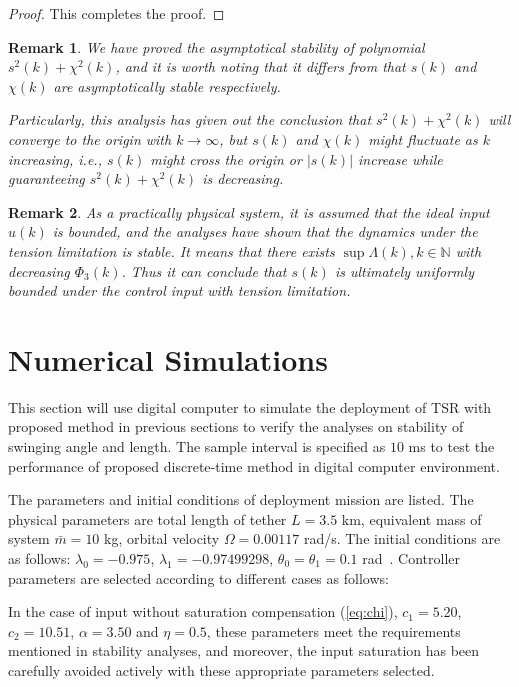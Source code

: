\documentclass[10pt,onecolumn,draftcls]{IEEEtran}
\newtheorem{myrem}{Remark}
\begin{document}
\begin{proof}
This completes the proof.\end{proof}
\begin{myrem}
	We have proved the asymptotical stability of polynomial $s^2(k)+\chi^2(k)$, and it is worth noting that it differs from that $s(k)$ and $\chi(k)$ are asymptotically stable respectively. 
	
	Particularly, this analysis has given out the conclusion that $s^2(k)+\chi^2(k)$ will converge to the origin with $k\to\infty$, but $s(k)$ and $\chi(k)$ might fluctuate as $k$ increasing, i.e., $s(k)$ might cross the origin or $\vert s(k)\vert$ increase while guaranteeing $s^2(k)+\chi^2(k)$ is decreasing. 
\end{myrem}
\begin{myrem}
	As a practically physical system, it is assumed that the ideal input $u(k)$ is bounded, and the analyses have shown that the dynamics under the tension limitation is stable. It means that there exists $\sup{\Lambda(k)},{k\in \mathbb{N}}$ with decreasing $\Phi_3(k)$. Thus it can conclude that $s(k)$ is ultimately uniformly bounded under the control input with tension limitation.
\end{myrem}

\section{Numerical Simulations}\label{sec:Numerical Simulations} 
This section will use digital computer to simulate the deployment of TSR with proposed method in previous sections to verify the analyses on stability of swinging angle and length. The sample interval is specified as $10$ ms to test the performance of proposed discrete-time method in digital computer environment. 

The parameters and initial conditions of deployment mission are listed. The physical parameters are total length of tether $L=3.5$  km, equivalent mass of system $\bar m=10$ kg, orbital velocity $\Omega = 0.00117$ rad/s. The initial conditions are as follows: $\lambda_0=-0.975$, $\lambda_1=-0.97499298$, $\theta_0=\theta_1=0.1$ rad~\cite{williams2008deployment}. Controller parameters are selected according to different cases as follows:

In the case of input without saturation compensation (\ref{eq:chi}), $c_1=5.20$, $c_2=10.51$, $\alpha=3.50$ and $\eta=0.5$, these parameters meet the requirements mentioned in stability analyses, and moreover, the input saturation has been carefully avoided actively with these appropriate parameters selected. 
\end{document}
